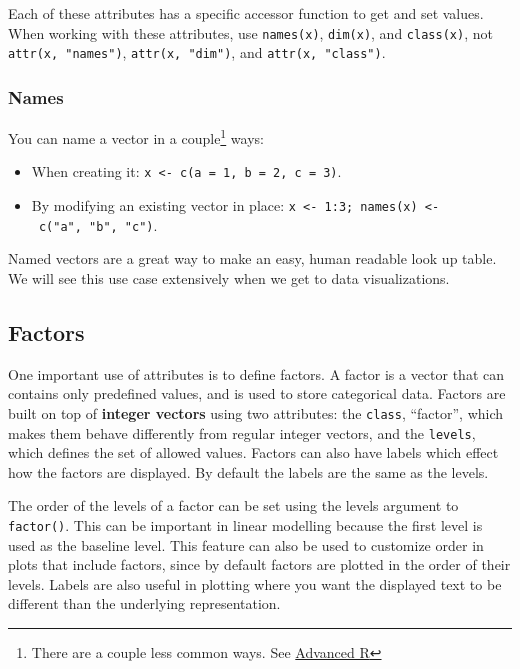 \documentclass[]{book}
\let\rmarkdownfootnote\footnote%
\def\footnote{\protect\rmarkdownfootnote}
\theoremstyle{definition}
\theoremstyle{definition}
\theoremstyle{definition}
\theoremstyle{remark}
\begin{document}
Each of these attributes has a specific accessor function to get and set
values. When working with these attributes, use \texttt{names(x)},
\texttt{dim(x)}, and \texttt{class(x)}, not \texttt{attr(x,\ "names")},
\texttt{attr(x,\ "dim")}, and \texttt{attr(x,\ "class")}.

\subsubsection{Names}\label{names}

You can name a vector in a couple\footnote{There are a couple less
  common ways. See \href{http://adv-r.had.co.nz}{Advanced R}} ways:

\begin{itemize}
\item
  When creating it:
  \texttt{x\ \textless{}-\ c(a\ =\ 1,\ b\ =\ 2,\ c\ =\ 3)}.
\item
  By modifying an existing vector in place:
  \texttt{x\ \textless{}-\ 1:3;\ names(x)\ \textless{}-\ c("a",\ "b",\ "c")}.
\end{itemize}

Named vectors are a great way to make an easy, human readable look up
table. We will see this use case extensively when we get to data
visualizations.

\subsection{Factors}\label{factors}

One important use of attributes is to define factors. A factor is a
vector that can contains only predefined values, and is used to store
categorical data. Factors are built on top of \textbf{integer vectors}
using two attributes: the \texttt{class}, ``factor'', which makes them
behave differently from regular integer vectors, and the
\texttt{levels}, which defines the set of allowed values. Factors can
also have labels which effect how the factors are displayed. By default
the labels are the same as the levels.

The order of the levels of a factor can be set using the levels argument
to \texttt{factor()}. This can be important in linear modelling because
the first level is used as the baseline level. This feature can also be
used to customize order in plots that include factors, since by default
factors are plotted in the order of their levels. Labels are also useful
in plotting where you want the displayed text to be different than the
underlying representation.
\end{document}
